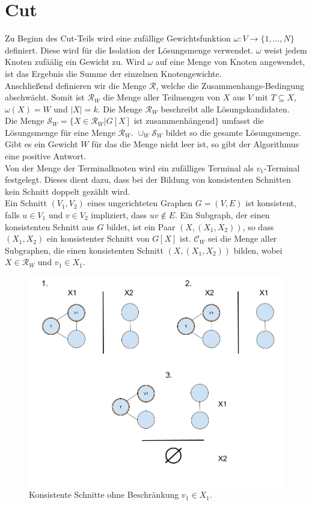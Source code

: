 \section{Cut}
\label{sec:st_cut}
Zu Beginn des Cut-Teils wird eine zufällige Gewichtsfunktion $\omega:V\rightarrow \{1,\dots,N\}$ definiert. 
Diese wird für die Isolation der Lösungsmenge verwendet. 
$\omega$ weist jedem Knoten zufäälig ein Gewicht zu. 
Wird $\omega$ auf eine Menge von Knoten angewendet, ist das Ergebnis die Summe der einzelnen Knotengewichte.\\
Anschließend definieren wir die Menge $\mathcal{R}$, welche die Zusammenhangs-Bedingung abschwächt. 
Somit ist $\mathcal{R}_W$ die Menge aller Teilmengen von $X$ aus $V$ mit $T \subseteq X$, $\omega(X)=W$ und $|X|=k$. Die Menge $\mathcal{R}_W$ beschreibt alle Lösungskandidaten.\\
Die Menge $\mathcal{S}_W=\{X \in \mathcal{R}_W | G[X]$ ist zusammenhängend$\}$ umfasst die Lösungsmenge für eine Menge $\mathcal{R}_W$. 
$\cup_W \mathcal{S}_W$ bildet so die gesamte Lösungsmenge. 
Gibt es ein Gewicht $W$ für das die Menge nicht leer ist, so gibt der Algorithmus eine positive Antwort.\\
Von der Menge der Terminalknoten wird ein zufälliges Terminal als $v_1$-Terminal festgelegt. 
Dieses dient dazu, dass bei der Bildung von konsistenten Schnitten kein Schnitt doppelt gezählt wird.\\
Ein Schnitt $(V_1,V_2)$ eines ungerichteten Graphen $G=(V,E)$ ist konsistent, falls $u \in V_1$ und $v \in V_2$ impliziert, dass $uv \notin E$. 
Ein Subgraph, der einen konsistenten Schnitt aus $G$ bildet, ist ein Paar $(X,(X_1,X_2))$, so dass $(X_1,X_2)$ ein konsistenter Schnitt von $G[X]$ ist.
$\mathcal{C}_W$ sei die Menge aller Subgraphen, die einen konsistenten Schnitt $(X,(X_1,X_2))$ bilden, wobei $X\in \mathcal{R}_W$ und $v_1 \in X_1$.
\begin{figure}
\label{fig:st_cut}
  \centering
    \includegraphics[width=1.0\textwidth]{./imgs/terminal_v1.png}
  	\caption{Konsistente Schnitte ohne Beschränkung $v_1 \in X_1$.}
\end{figure}

